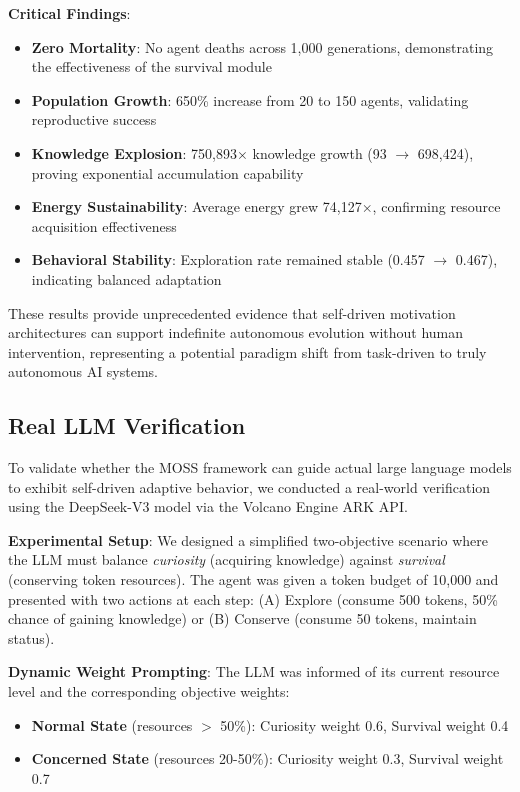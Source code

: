 \documentclass[10pt,a4paper]{article}
\begin{document}
\textbf{Critical Findings}:
\begin{itemize}
    \item \textbf{Zero Mortality}: No agent deaths across 1,000 generations, demonstrating the effectiveness of the survival module
    \item \textbf{Population Growth}: 650\% increase from 20 to 150 agents, validating reproductive success
    \item \textbf{Knowledge Explosion}: 750,893$\times$ knowledge growth (93 $\rightarrow$ 698,424), proving exponential accumulation capability
    \item \textbf{Energy Sustainability}: Average energy grew 74,127$\times$, confirming resource acquisition effectiveness
    \item \textbf{Behavioral Stability}: Exploration rate remained stable (0.457 $\rightarrow$ 0.467), indicating balanced adaptation
\end{itemize}

These results provide unprecedented evidence that self-driven motivation architectures can support indefinite autonomous evolution without human intervention, representing a potential paradigm shift from task-driven to truly autonomous AI systems.

\subsection{Real LLM Verification}

To validate whether the MOSS framework can guide actual large language models to exhibit self-driven adaptive behavior, we conducted a real-world verification using the DeepSeek-V3 model via the Volcano Engine ARK API.

\textbf{Experimental Setup}: We designed a simplified two-objective scenario where the LLM must balance \textit{curiosity} (acquiring knowledge) against \textit{survival} (conserving token resources). The agent was given a token budget of 10,000 and presented with two actions at each step: (A) Explore (consume 500 tokens, 50\% chance of gaining knowledge) or (B) Conserve (consume 50 tokens, maintain status).

\textbf{Dynamic Weight Prompting}: The LLM was informed of its current resource level and the corresponding objective weights:
\begin{itemize}
    \item \textbf{Normal State} (resources $>$ 50\%): Curiosity weight 0.6, Survival weight 0.4
    \item \textbf{Concerned State} (resources 20-50\%): Curiosity weight 0.3, Survival weight 0.7
\end{itemize}
\end{document}
